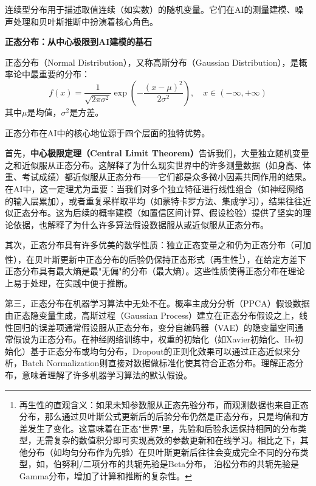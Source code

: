 连续型分布用于描述取值连续（如实数）的随机变量。它们在AI的测量建模、噪声处理和贝叶斯推断中扮演着核心角色。

\textbf{正态分布：从中心极限到AI建模的基石}

正态分布（Normal Distribution），又称高斯分布（Gaussian Distribution），是概率论中最重要的分布：
\begin{equation}
f(x) = \frac{1}{\sqrt{2\pi\sigma^2}}\exp\left(-\frac{(x-\mu)^2}{2\sigma^2}\right), \quad x\in (-\infty, +\infty)
\end{equation}
其中$\mu$是均值，$\sigma^2$是方差。

正态分布在AI中的核心地位源于四个层面的独特优势。

首先，\textbf{中心极限定理（Central Limit Theorem）}告诉我们，大量独立随机变量之和近似服从正态分布。这解释了为什么现实世界中的许多测量数据（如身高、体重、考试成绩）都近似服从正态分布——它们都是众多微小因素共同作用的结果。在AI中，这一定理尤为重要：当我们对多个独立特征进行线性组合（如神经网络的输入层累加），或者重复采样取平均（如蒙特卡罗方法、集成学习），结果往往近似正态分布。这为后续的概率建模（如置信区间计算、假设检验）提供了坚实的理论依据，也解释了为什么许多算法假设数据服从或近似服从正态分布。

其次，正态分布具有许多优美的数学性质：独立正态变量之和仍为正态分布（可加性），在贝叶斯更新中正态分布的后验仍保持正态形式（再生性\footnote{再生性的直观含义：如果未知参数服从正态先验分布，而观测数据也来自正态分布，那么通过贝叶斯公式更新后的后验分布仍然是正态分布，只是均值和方差发生了变化。这意味着在正态"世界"里，先验和后验永远保持相同的分布类型，无需复杂的数值积分即可实现高效的参数更新和在线学习。相比之下，其他分布（如均匀分布作为先验）在贝叶斯更新后往往会变成完全不同的分布类型，如，伯努利/二项分布的共轭先验是Beta分布， 泊松分布的共轭先验是Gamma分布，增加了计算和推断的复杂性。}），在给定方差下正态分布具有最大熵是最"无偏"的分布（最大熵）。这些性质使得正态分布在理论上易于处理，在实践中便于推断。

第三，正态分布在机器学习算法中无处不在。概率主成分分析（PPCA）假设数据由正态隐变量生成，高斯过程（Gaussian Process）建立在正态分布假设之上，线性回归的误差项通常假设服从正态分布，变分自编码器（VAE）的隐变量空间通常假设为正态分布。在神经网络训练中，权重的初始化（如Xavier初始化、He初始化）基于正态分布或均匀分布，Dropout的正则化效果可以通过正态近似来分析，Batch Normalization则直接对数据做标准化使其符合正态分布。理解正态分布，意味着理解了许多机器学习算法的默认假设。

